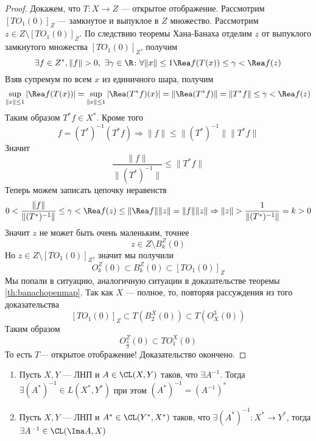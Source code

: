 \begin{proof}
	Докажем, что $T\colon X \to Z$ --- открытое отображение. Рассмотрим $[TO_1(0)]_Z$ --- замкнутое и выпуклое в $Z$ множество. Рассмотрим $z \in Z \setminus [TO_1(0)]_Z$. По следствию теоремы Хана-Банаха отделим $z$ от выпуклого замкнутого множества $[TO_1(0)]_Z$, получим 
	$$
	\exists f \in Z^*, \|f\| > 0 , \ \exists\gamma \in \R \colon\forall \|x\|\leq 1  \Rea f(T(x)) \leq \gamma < \Rea f(z)
	$$
	Взяв супремум по всем $x$ из единичного шара, получим
	$$
	\sup\limits_{\|x\| \leq 1} |\Rea f(T(x))| = 	\sup\limits_{\|x\| \leq 1} |\Rea (T^* f)(x)| = \|\Rea (T^* f)\| = \|T^* f\|\leq\gamma < \Rea f(z)
	$$
	Таким образом $T^* f \in X^*$. Кроме того 
	$$
	f = (T^*)^{-1}(T^*f) \Rightarrow \|f\| \leq \|(T^*)^{-1}\| \|T^*f\| 
	$$
	Значит
	$$
	\frac{\|f\|}{\|(T^*)^{-1}\|} \leq \|T^*f\|
	$$
	Теперь можем записать цепочку неравенств
	$$
	0 < \frac{\|f\|}{\|(T^*)^{-1}\|} \leq \gamma < \Rea f(z) \leq \|\Rea f\| \|z\| = \|f\| \|z\| \Rightarrow \|z\| > \frac{1}{\|(T^*)^{-1}\|} = k > 0
	$$
	Значит $z$ не может быть очень маленьким, точнее
	$$
	z \in Z \setminus B_{k}^Z(0) 
	$$
	Но $z \in Z \setminus [TO_1(0)]_Z$, значит мы получили
	$$
	O_k^Z(0) \subset B_{k}^Z(0)  \subset [TO_1(0)]_Z 
	$$
	Мы попали в ситуацию, аналогичную ситуации в доказательстве теоремы \ref{th:banachopenmap}. Так как $X$ --- полное, то, повторяя рассуждения из того доказательства 
	$$
	 [TO_1(0)]_Z  \subset T(B_2^X(0)) \subset T(O_X^3(0))
	$$
	Таким образом 
	$$
	O_{\frac{k}{3}}^Z(0) \subset TO_1^X(0) 
	$$
	То есть $T$--- открытое отображение! Доказательство окончено.
\end{proof}
\begin{claim}
	\hfill
	\begin{enumerate}
		\item Пусть $X,Y$ --- ЛНП и $A \in \CL(X,Y)$ таков, что $\exists A^{-1 }$. Тогда $\exists (A^*)^{-1} \in L(X^*, Y^*)$ при этом $(A^*)^{-1} = (A^{-1})^*$
		\item Пусть $X,Y$ --- ЛНП и $A^* \in \CL(Y^*, X^*)$ таков, что $\exists (A^*)^{-1}\colon X^* \to Y^*$, тогда $\exists A^{-1} \in \CL(\Ima A, X)$
	\end{enumerate}	
\end{claim}
